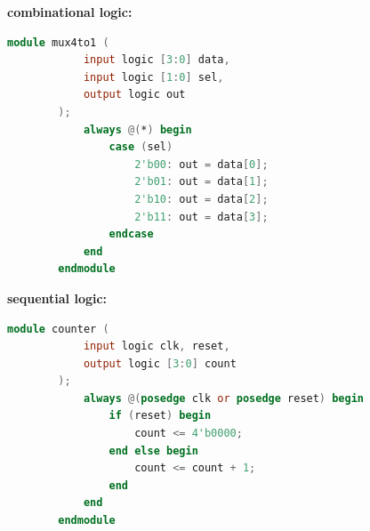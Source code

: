 \documentclass{article}
\begin{document}
\begin{multicols}{2}
    \textbf{combinational logic:}\\

    \begin{lstlisting}[language=Verilog,frame=single,backgroundcolor=\color{White},basicstyle=\color{LightGreen},showspaces=false,showstringspaces=false]
        module mux4to1 (
            input logic [3:0] data,
            input logic [1:0] sel,
            output logic out
        );
            always @(*) begin
                case (sel)
                    2'b00: out = data[0];
                    2'b01: out = data[1];
                    2'b10: out = data[2];
                    2'b11: out = data[3];
                endcase
            end
        endmodule
    \end{lstlisting}
    \columnbreak
    \textbf{sequential logic:}\\

    \begin{lstlisting}[language=Verilog,frame=single,backgroundcolor=\color{White},basicstyle=\color{LightGreen},showspaces=false,showstringspaces=false]
        module counter (
            input logic clk, reset,
            output logic [3:0] count
        );
            always @(posedge clk or posedge reset) begin
                if (reset) begin
                    count <= 4'b0000;
                end else begin
                    count <= count + 1;
                end
            end
        endmodule
    \end{lstlisting}
\end{multicols}
\end{document}
